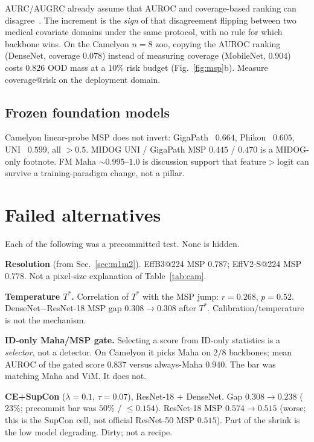 \documentclass[10pt,twocolumn,letterpaper]{article}
\begin{document}
AURC/AUGRC already assume that AUROC and coverage-based ranking can disagree~\cite{geifman2019selectivenet,traub2024augrc}.
The increment is the \emph{sign} of that disagreement flipping between two medical covariate domains under the same protocol, with no rule for which backbone wins.
On the Camelyon $n{=}8$ zoo, copying the AUROC ranking (DenseNet, coverage $0.078$) instead of measuring coverage (MobileNet, $0.904$) costs $0.826$ OOD mass at a $10\%$ risk budget (Fig.~\ref{fig:msp}b).
Measure coverage@risk on the deployment domain.

\subsection{Frozen foundation models}

Camelyon linear-probe MSP does not invert: GigaPath~\cite{xu2024gigapath} $0.664$, Phikon~\cite{filiot2023phikon} $0.605$, UNI~\cite{chen2024uni} $0.599$, all ${>}0.5$.
MIDOG UNI / GigaPath MSP $0.445$ / $0.470$ is a MIDOG-only footnote.
FM Maha ${\sim}0.995$--$1.0$ is discussion support that feature${>}$logit can survive a training-paradigm change, not a pillar.

\section{Failed alternatives}
\label{sec:failed}

Each of the following was a precommitted test. None is hidden.

\textbf{Resolution} (from Sec.~\ref{sec:m1m2}).
EffB3@224 MSP $0.787$; EffV2-S@224 MSP $0.778$.
Not a pixel-size explanation of Table~\ref{tab:cam}.

\textbf{Temperature $T^\ast$.}
Correlation of $T^\ast$ with the MSP jump: $r{=}0.268$, $p{=}0.52$.
DenseNet${-}$ResNet-18 MSP gap $0.308{\to}0.308$ after $T^\ast$.
Calibration/temperature is not the mechanism.

\textbf{ID-only Maha/MSP gate.}
Selecting a score from ID-only statistics is a \emph{selector}, not a detector.
On Camelyon it picks Maha on $2/8$ backbones; mean AUROC of the gated score $0.837$ versus always-Maha $0.940$.
The bar was matching Maha and ViM. It does not.

\textbf{CE{+}SupCon} ($\lambda{=}0.1$, $\tau{=}0.07$), ResNet-18 ${+}$ DenseNet.
Gap $0.308{\to}0.238$ ($23\%$; precommit bar was $50\%$ / ${\le}0.154$).
ResNet-18 MSP $0.574{\to}\mathbf{0.515}$ (worse; this is the SupCon cell, not official ResNet-50 MSP $0.515$).
Part of the shrink is the low model degrading.
Dirty; not a recipe.
\end{document}
